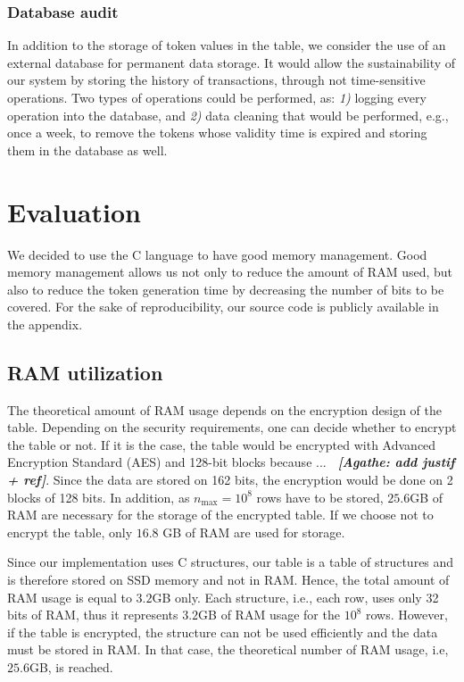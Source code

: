 \documentclass{llncs}
\newcommand{\ab}[1]{\emph{\bf \color{blue}~[Agathe: #1]}}
\begin{document}
\subsubsection{Database audit}

In addition to the storage of token values in the table, we consider the use of an external database for permanent data storage. It would allow the sustainability of our system by storing the history of transactions, through not time-sensitive operations. Two types of operations could be performed, as: \textit{1)} logging every operation into the database, and \textit{2)} data cleaning that would be performed, e.g., once a week, to remove the tokens whose validity time is expired and storing them in the database as well.

\section{Evaluation}

We decided to use the C language to have good memory management. Good memory management allows us not only to reduce the amount of RAM used, but also to reduce the token generation time by decreasing the number of bits to be covered.
For the sake of reproducibility, our source code is publicly available in the appendix.

\subsection{RAM utilization} 

The theoretical amount of RAM usage depends on the encryption design of the table. Depending on the security requirements, one can decide whether to encrypt the table or not. If it is the case, the table would be encrypted with Advanced Encryption Standard (AES) and 128-bit blocks because ... \ab{add justif + ref}. Since the data are stored on 162 bits, the encryption would be done on 2 blocks of 128 bits. In addition, as $n_{\max} = 10^8$ rows have to be stored, $25.6$GB of RAM are necessary for the storage of the encrypted table. If we choose not to encrypt the table, only $16.8$ GB of RAM are used for storage.

Since our implementation uses C structures, our table is a table of structures and is therefore stored on SSD memory and not in RAM. Hence, the total amount of RAM usage is equal to $3.2$GB only. Each structure, i.e., each row, uses only 32 bits of RAM, thus it represents $3.2$GB of RAM usage for the $10^8$ rows. However, if the table is encrypted, the structure can not be used efficiently and the data must be stored in RAM. In that case, the theoretical number of RAM usage, i.e, $25.6$GB, is reached.
\end{document}
